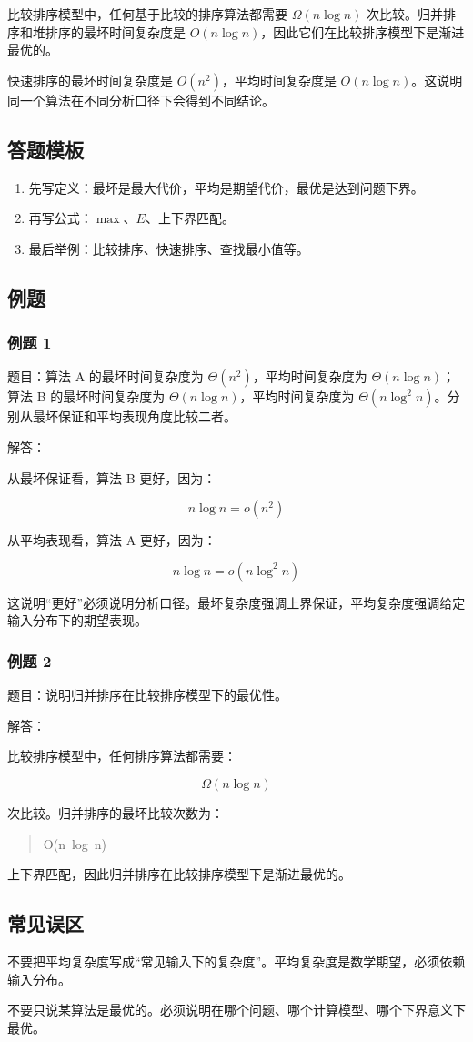\documentclass[UTF8,zihao=-4]{ctexart}
\begin{document}
比较排序模型中，任何基于比较的排序算法都需要 $\Omega(n \log n)$ 次比较。归并排序和堆排序的最坏时间复杂度是 $O(n \log n)$，因此它们在比较排序模型下是渐进最优的。

快速排序的最坏时间复杂度是 $O(n^2)$，平均时间复杂度是 $O(n \log n)$。这说明同一个算法在不同分析口径下会得到不同结论。

\subsection*{答题模板}

\begin{enumerate}
\item 先写定义：最坏是最大代价，平均是期望代价，最优是达到问题下界。
\item 再写公式：$\max$、$E$、上下界匹配。
\item 最后举例：比较排序、快速排序、查找最小值等。
\end{enumerate}

\subsection*{例题}

\subsubsection*{例题 1}

题目：算法 A 的最坏时间复杂度为 $\Theta(n^2)$，平均时间复杂度为 $\Theta(n \log n)$；算法 B 的最坏时间复杂度为 $\Theta(n \log n)$，平均时间复杂度为 $\Theta(n \log^2 n)$。分别从最坏保证和平均表现角度比较二者。

解答：

从最坏保证看，算法 B 更好，因为：

\[n \log n = o(n^{2})\]

从平均表现看，算法 A 更好，因为：

\[n \log n = o(n \log^{2} n)\]

这说明“更好”必须说明分析口径。最坏复杂度强调上界保证，平均复杂度强调给定输入分布下的期望表现。

\subsubsection*{例题 2}

题目：说明归并排序在比较排序模型下的最优性。

解答：

比较排序模型中，任何排序算法都需要：

\[\Omega(n \log n)\]

次比较。归并排序的最坏比较次数为：

\begin{quote}
\small\ttfamily\raggedright
\relax O(n\ log\ n)\\
\end{quote}

上下界匹配，因此归并排序在比较排序模型下是渐进最优的。

\subsection*{常见误区}

不要把平均复杂度写成“常见输入下的复杂度”。平均复杂度是数学期望，必须依赖输入分布。

不要只说某算法是最优的。必须说明在哪个问题、哪个计算模型、哪个下界意义下最优。
\end{document}
